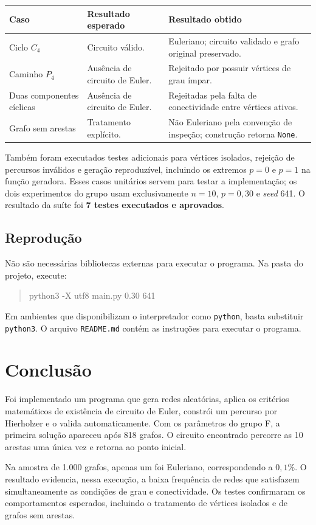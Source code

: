 \documentclass[11pt,a4paper]{article}
\newcommand{\funcao}[1]{\texttt{#1}}
\begin{document}
\begin{center}
\small
\begin{tabularx}{\textwidth}{@{}p{3.35cm}YY@{}}
\toprule
Caso & Resultado esperado & Resultado obtido \\
\midrule
Ciclo $C_4$ & Circuito válido. & Euleriano; circuito validado e grafo original preservado. \\
\addlinespace[4pt]
Caminho $P_4$ & Ausência de circuito de Euler. & Rejeitado por possuir vértices de grau ímpar. \\
\addlinespace[4pt]
Duas componentes cíclicas & Ausência de circuito de Euler. & Rejeitadas pela falta de conectividade entre vértices ativos. \\
\addlinespace[4pt]
Grafo sem arestas & Tratamento explícito. & Não Euleriano pela convenção de inspeção; construção retorna \funcao{None}. \\
\bottomrule
\end{tabularx}
\end{center}

Também foram executados testes adicionais para vértices isolados,
rejeição de percursos inválidos e geração reproduzível, incluindo
os extremos $p=0$ e $p=1$ na função geradora. Esses casos unitários
servem para testar a implementação; os dois experimentos do grupo usam
exclusivamente $n=10$, $p=0{,}30$ e \textit{seed} 641.
O resultado da suíte foi \textbf{7 testes executados e aprovados}.

\subsection{Reprodução}

Não são necessárias bibliotecas externas para executar o programa.
Na pasta do projeto, execute:

\begin{quote}
\ttfamily\small
python3 -X utf8 main.py 0.30 641
\end{quote}

Em ambientes que disponibilizam o interpretador como \funcao{python},
basta substituir \funcao{python3}. O arquivo \funcao{README.md} contém
as instruções para executar o programa.

\section{Conclusão}

Foi implementado um programa que gera redes aleatórias, aplica os critérios
matemáticos de existência de circuito de Euler, constrói um percurso
por Hierholzer e o valida automaticamente. Com os parâmetros do grupo F,
a primeira solução apareceu após 818 grafos. O circuito encontrado
percorre as 10 arestas uma única vez e retorna ao ponto inicial.

Na amostra de 1.000 grafos, apenas um foi Euleriano, correspondendo a
$0{,}1\%$. O resultado evidencia, nessa execução, a baixa frequência
de redes que satisfazem simultaneamente as condições de grau e
conectividade. Os testes confirmaram os comportamentos esperados,
incluindo o tratamento de vértices isolados e de grafos sem arestas.
\end{document}
